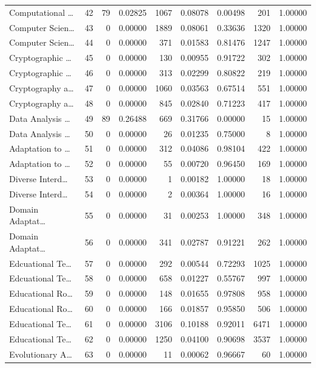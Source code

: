 \begin{table}
\begin{tabular}{lrrrrrrrr}
Computational … & 42 & 79 & 0.02825 & 1067 & 0.08078 & 0.00498 & 201 & 1.00000 \\
Computer Scien… & 43 & 0 & 0.00000 & 1889 & 0.08061 & 0.33636 & 1320 & 1.00000 \\
Computer Scien… & 44 & 0 & 0.00000 & 371 & 0.01583 & 0.81476 & 1247 & 1.00000 \\
Cryptographic … & 45 & 0 & 0.00000 & 130 & 0.00955 & 0.91722 & 302 & 1.00000 \\
Cryptographic … & 46 & 0 & 0.00000 & 313 & 0.02299 & 0.80822 & 219 & 1.00000 \\
Cryptography a… & 47 & 0 & 0.00000 & 1060 & 0.03563 & 0.67514 & 551 & 1.00000 \\
Cryptography a… & 48 & 0 & 0.00000 & 845 & 0.02840 & 0.71223 & 417 & 1.00000 \\
Data Analysis … & 49 & 89 & 0.26488 & 669 & 0.31766 & 0.00000 & 15 & 1.00000 \\
Data Analysis … & 50 & 0 & 0.00000 & 26 & 0.01235 & 0.75000 & 8 & 1.00000 \\
Adaptation to … & 51 & 0 & 0.00000 & 312 & 0.04086 & 0.98104 & 422 & 1.00000 \\
Adaptation to … & 52 & 0 & 0.00000 & 55 & 0.00720 & 0.96450 & 169 & 1.00000 \\
Diverse Interd… & 53 & 0 & 0.00000 & 1 & 0.00182 & 1.00000 & 18 & 1.00000 \\
Diverse Interd… & 54 & 0 & 0.00000 & 2 & 0.00364 & 1.00000 & 16 & 1.00000 \\
Domain Adaptat… & 55 & 0 & 0.00000 & 31 & 0.00253 & 1.00000 & 348 & 1.00000 \\
Domain Adaptat… & 56 & 0 & 0.00000 & 341 & 0.02787 & 0.91221 & 262 & 1.00000 \\
Edcuational Te… & 57 & 0 & 0.00000 & 292 & 0.00544 & 0.72293 & 1025 & 1.00000 \\
Edcuational Te… & 58 & 0 & 0.00000 & 658 & 0.01227 & 0.55767 & 997 & 1.00000 \\
Educational Ro… & 59 & 0 & 0.00000 & 148 & 0.01655 & 0.97808 & 958 & 1.00000 \\
Educational Ro… & 60 & 0 & 0.00000 & 166 & 0.01857 & 0.95850 & 506 & 1.00000 \\
Educational Te… & 61 & 0 & 0.00000 & 3106 & 0.10188 & 0.92011 & 6471 & 1.00000 \\
Educational Te… & 62 & 0 & 0.00000 & 1250 & 0.04100 & 0.90698 & 3537 & 1.00000 \\
Evolutionary A… & 63 & 0 & 0.00000 & 11 & 0.00062 & 0.96667 & 60 & 1.00000 \\

\end{tabular}
\end{table}
